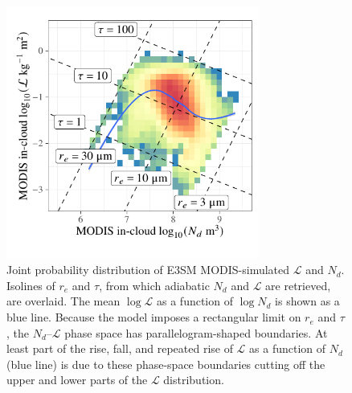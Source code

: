\documentclass[acp, manuscript]{copernicus}\usepackage[]{graphicx}\usepackage[]{xcolor}
\newenvironment{knitrout}{}{} %
\newcommand\nd{\ensuremath{N_d}}
\newcommand\lwp{\ensuremath{\mathcal L}}
\begin{document}
\begin{figure}[t]
  \centering
\begin{knitrout}
\color{fgcolor}

{\centering \includegraphics[width=8.3cm]{figure/cosp-tau-re-plot-1} 

}


\end{knitrout}
  \caption{Joint probability distribution of E3SM MODIS-simulated \lwp{} and
    \nd{}.  Isolines of $r_e$ and $\tau$, from which adiabatic \nd{} and \lwp{}
    are retrieved, are overlaid.  The mean $\log\lwp$ as a function of $\log
    \nd$ is shown as a blue line.  Because the model imposes a rectangular limit
    on $r_e$ and $\tau$, the \nd--\lwp{} phase space has parallelogram-shaped
    boundaries.  At least part of the rise, fall, and repeated rise of \lwp{} as
    a function of \nd{} (blue line) is due to these phase-space boundaries cutting off the upper and lower parts of the \lwp{} distribution.}
  \label{fig:cosp}
\end{figure}
%
\clearpage
%
%
%
%
%
%
%
\end{document}
